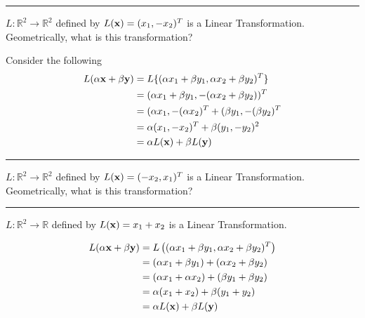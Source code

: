 \rule[0.01in]{\textwidth}{0.0025in}













\begin{example}
$L:\mathbb{R}^2 \to \mathbb{R}^2$ defined by $L({\bf x}) = (x_1, -x_2)^T$  is a Linear Transformation.  Geometrically, what is this transformation?

Consider the following
\begin{align*}
L(\alpha {\bf x}+ \beta {\bf y}) &=  L \{ (\alpha x_1 + \beta y_1, \alpha x_2 + \beta y_2)^T\}\\
&= (\alpha x_1 + \beta y_1, -(\alpha x_2 + \beta y_2))^T\\
&=  (\alpha x_1,  -(\alpha x_2)^T + (  \beta y_1, -(\beta y_2)^T\\
&= \alpha(x_1, -x_2)^T + \beta (y_1, -y_2)^2\\
&= \alpha L({\bf x}) + \beta L({\bf y})
\end{align*}
\end{example}

\rule[0.01in]{\textwidth}{0.0025in}









\begin{example}
$L:\mathbb{R}^2 \to \mathbb{R}^2$ defined by $L({\bf x}) = (-x_2, x_1)^T$  is a Linear Transformation.  Geometrically, what is this transformation?
\end{example}

\rule[0.01in]{\textwidth}{0.0025in}








\begin{example}
$L:\mathbb{R}^2 \to \mathbb{R}$ defined by $L({\bf x}) = x_1+x_2$  is a Linear Transformation.  %

\begin{align*}  L(\alpha {\bf x} + \beta {\bf y}) &= L \left( (\alpha x_1 + \beta y_1,  \alpha x_2 + \beta y_2)^T \right)\\
&= (\alpha x_1 + \beta y_1) + (\alpha x_2 + \beta y_2)\\
&= (\alpha x_1 +   \alpha x_2) + (\beta y_1 + \beta y_2)\\
&= \alpha (x_1 + x_2) + \beta (y_1 + y_2)\\
&= \alpha L({\bf x}) + \beta L({\bf y})
\end{align*}
\end{example}

